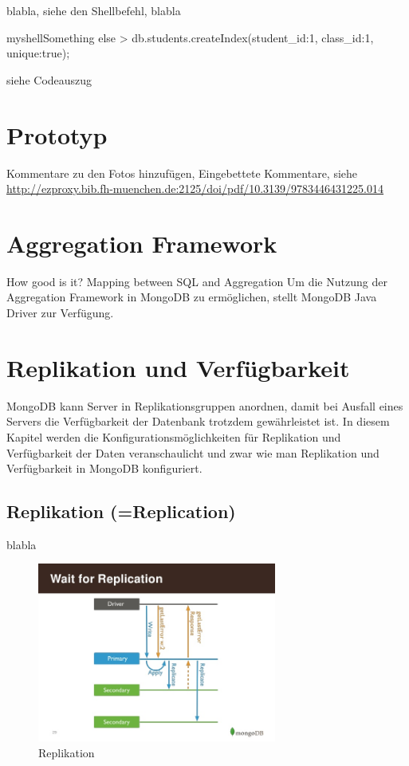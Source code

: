 blabla, siehe den Shellbefehl, blabla

\begin{listingsboxShell}[label={lst:X}]{myshell}{Something else}
> db.students.createIndex({student_id:1, class_id:1}, {unique:true});
\end{listingsboxShell}
siehe Codeauszug 

\section{Prototyp}
Kommentare zu den Fotos hinzufügen, Eingebettete Kommentare, siehe \url{http://ezproxy.bib.fh-muenchen.de:2125/doi/pdf/10.3139/9783446431225.014}

\section{Aggregation Framework}
How good is it? Mapping between SQL and Aggregation
Um die Nutzung der Aggregation Framework in MongoDB zu ermöglichen, stellt MongoDB Java Driver zur Verfügung. 

\section{Replikation und Verfügbarkeit}
MongoDB kann Server in Replikationsgruppen anordnen, damit bei Ausfall eines Servers die Verfügbarkeit der Datenbank trotzdem gewährleistet ist. In diesem Kapitel werden die Konfigurationsmöglichkeiten für Replikation und Verfügbarkeit der Daten veranschaulicht und zwar wie man Replikation und Verfügbarkeit in MongoDB konfiguriert.
\subsection{Replikation (=Replication)}
blabla

\begin{figure}
\centering
\includegraphics[width=0.7\textwidth]{resources/replication}
\caption[Replikation]{Replikation\protect\footnotemark}
\label{img:Replikation}
\end{figure}

